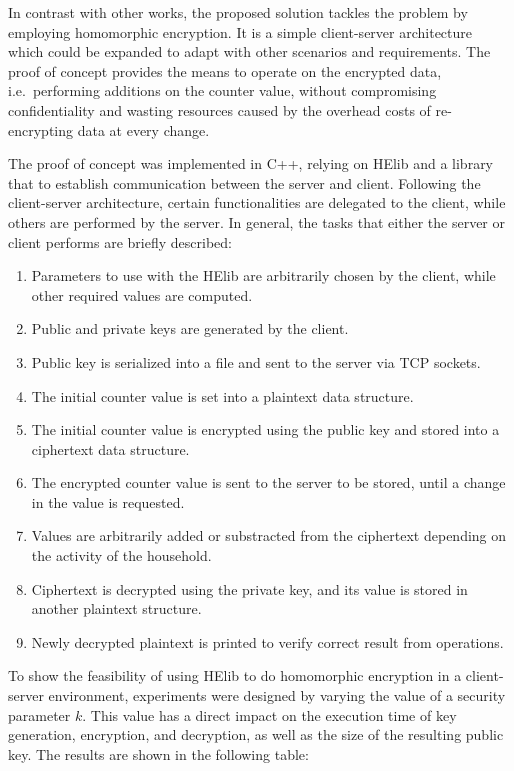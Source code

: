 \documentclass{article}
\begin{document}
In contrast with other works, the proposed solution tackles the problem by employing homomorphic encryption. It is a simple client-server architecture which could be expanded to adapt with other scenarios and requirements. The proof of concept provides the means to operate on the encrypted data, i.e.\ performing additions on the counter value, without compromising confidentiality and wasting resources caused by the overhead costs of re-encrypting data at every change.

The proof of concept was implemented in C++, relying on HElib and a library that to establish communication between the server and client. Following the client-server architecture, certain functionalities are delegated to the client, while others are performed by the server. In general, the tasks that either the server or client performs are briefly described:

\begin{enumerate}
	\item Parameters to use with the HElib are arbitrarily chosen by the client, while other required values are computed.
	\item Public and private keys are generated by the client.
	\item Public key is serialized into a file and sent to the server via TCP sockets.
	\item The initial counter value is set into a plaintext data structure.
	\item The initial counter value is encrypted using the public key and stored into a ciphertext data structure.
        \item The encrypted counter value is sent to the server to be stored, until a change in the value is requested.
	\item Values are arbitrarily added or substracted from the ciphertext depending on the activity of the household.
	\item Ciphertext is decrypted using the private key, and its value is stored in another plaintext structure.
	\item Newly decrypted plaintext is printed to verify correct result from operations.
\end{enumerate}

To show the feasibility of using HElib to do homomorphic encryption in a client-server environment, experiments were designed by varying the value of a security parameter $k$. This value has a direct impact on the execution time of key generation, encryption, and decryption, as well as the size of the resulting public key. The results are shown in the following table:
\end{document}
